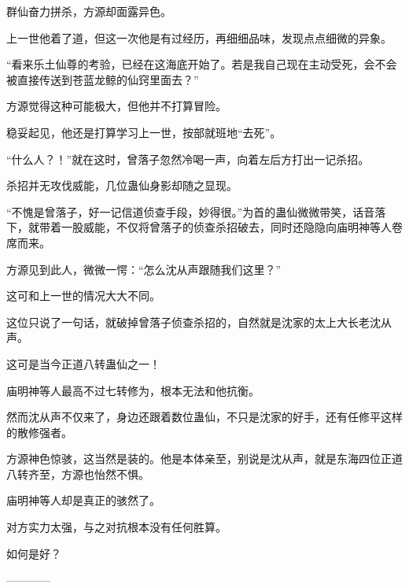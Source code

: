 \begin{this_body}
群仙奋力拼杀，方源却面露异色。

上一世他着了道，但这一次他是有过经历，再细细品味，发现点点细微的异象。

“看来乐土仙尊的考验，已经在这海底开始了。若是我自己现在主动受死，会不会被直接传送到苍蓝龙鲸的仙窍里面去？”

方源觉得这种可能极大，但他并不打算冒险。

稳妥起见，他还是打算学习上一世，按部就班地“去死”。

“什么人？！”就在这时，曾落子忽然冷喝一声，向着左后方打出一记杀招。

杀招并无攻伐威能，几位蛊仙身影却随之显现。

“不愧是曾落子，好一记信道侦查手段，妙得很。”为首的蛊仙微微带笑，话音落下，就带着一股威能，不仅将曾落子的侦查杀招破去，同时还隐隐向庙明神等人卷席而来。

方源见到此人，微微一愕：“怎么沈从声跟随我们这里？”

这可和上一世的情况大大不同。

这位只说了一句话，就破掉曾落子侦查杀招的，自然就是沈家的太上大长老沈从声。

这可是当今正道八转蛊仙之一！

庙明神等人最高不过七转修为，根本无法和他抗衡。

然而沈从声不仅来了，身边还跟着数位蛊仙，不只是沈家的好手，还有任修平这样的散修强者。

方源神色惊骇，这当然是装的。他是本体亲至，别说是沈从声，就是东海四位正道八转齐至，方源也怡然不惧。

庙明神等人却是真正的骇然了。

对方实力太强，与之对抗根本没有任何胜算。

如何是好？

------------

\end{this_body}

